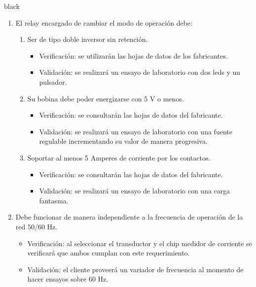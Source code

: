 \documentclass[11pt]{charter}
\begin{document}
\begin{consigna}{black}
\begin{enumerate}
\begin{enumerate}[label*=\arabic*.]
			\item El relay encargado de cambiar el modo de operación debe:
			\begin{enumerate}[label*=\arabic*.]
				\item Ser de tipo doble inversor sin retención.
					\begin{itemize}
						\item Verificación: se utilizarán las hojas de datos de los fabricantes.\\
						\item Validación: se realizará un ensayo de laboratorio con dos leds y un pulsador.\\
					\end{itemize}
				\item Su bobina debe poder energizarse con 5 V o menos.
					\begin{itemize}
						\item Verificación: se consultarán las hojas de datos del fabricante.\\
						\item Validación: se realizará un ensayo de laboratorio con una fuente regulable incrementando su valor de manera progresiva.\\
					\end{itemize}
				\item Soportar al menos 5 Amperes de corriente por los contactos.
					\begin{itemize}
						\item Verificación: se consultarán las hojas de datos del fabricante.\\
						\item Validación: se realizará un ensayo de laboratorio con una carga fantasma.\\
					\end{itemize}
			\end{enumerate}
			
			\item Debe funcionar de manera independiente a la frecuencia de operación de la red 50/60 Hz.
				\begin{itemize}
					\item Verificación: al seleccionar el transductor y el chip medidor de corriente se verificará que ambos cumplan con este requerimiento.\\
					\item Validación: el cliente proveerá un variador de frecuencia al momento de hacer ensayos sobre 60 Hz.\\
				\end{itemize}
			

\end{enumerate}
\end{enumerate}
\end{consigna}
\end{document}
